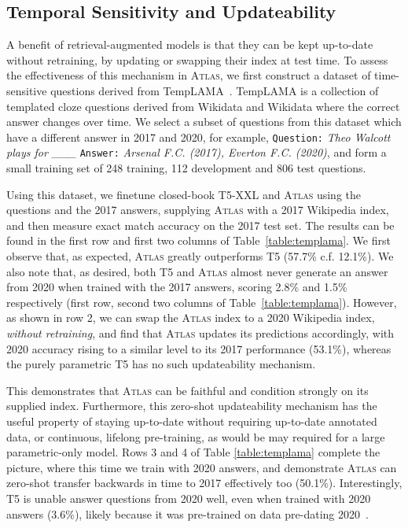 \documentclass[10pt]{article} \usepackage[preprint]{tmlr}
\newcommand{\Atlas}{\textsc{Atlas}}
\begin{document}
\subsection{Temporal Sensitivity and Updateability}
\label{sec:temporal}
A benefit of retrieval-augmented models is that they can be kept up-to-date without  retraining, by updating or swapping their index at test time.
To assess the effectiveness of this mechanism in \Atlas{},  we first construct a dataset of time-sensitive questions derived  from TempLAMA~\citep{dhingra-etal-2022-time}.
TempLAMA is a collection of templated cloze questions derived from Wikidata and Wikidata where the correct answer changes over time.
We select a subset of questions from this dataset which have a different answer in 2017 and 2020,  for example, \texttt{Question:} \textit{Theo Walcott plays for \_\_\_} \texttt{Answer:} \textit{Arsenal F.C. (2017), Everton F.C. (2020)}, and form a small training set of 248 training, 112 development and 806 test questions.

Using this dataset, we finetune closed-book T5-XXL and \Atlas{} using the questions and the 2017 answers, supplying \Atlas{} with a 2017 Wikipedia index, and then measure exact match accuracy on the 2017 test set.
The results can be found in the first row and first two columns of Table~\ref{table:templama}.
We first observe that, as expected, \Atlas{} greatly outperforms T5 (57.7\% c.f. 12.1\%).
We also note that, as desired, both T5 and \Atlas{} almost never generate an answer from 2020 when trained with the 2017 answers, scoring 2.8\% and 1.5\% respectively (first row, second two columns of Table~\ref{table:templama}).
However, as shown in row 2, we can swap the \Atlas{} index to a 2020 Wikipedia index,  \emph{without retraining}, and find that \Atlas{} updates its predictions accordingly, with 2020 accuracy rising to a similar level to its 2017 performance (53.1\%), whereas the purely parametric T5 has no such updateability mechanism.

This demonstrates that \Atlas{} can be faithful and condition strongly on its supplied index.
Furthermore, this zero-shot updateability mechanism has the useful property of staying up-to-date without requiring up-to-date annotated  data, or continuous, lifelong pre-training, as would be may required for a large parametric-only model. 
Rows 3 and 4 of Table \ref{table:templama} complete the picture, where this time we train with 2020 answers, and demonstrate \Atlas{} can zero-shot transfer backwards in time to 2017 effectively too (50.1\%). 
Interestingly, T5 is unable answer questions from 2020 well, even when trained with 2020 answers (3.6\%), likely because it was pre-trained on data pre-dating 2020~\citep{dodge-etal-2021-documenting}.
\end{document}
